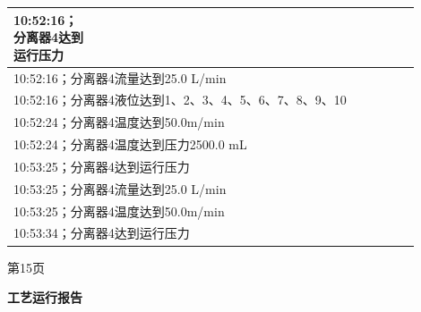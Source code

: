 \documentclass[UTF8,10pt,a4paper,fontset=fandol]{ctexart}
\newcommand{\fieldvalue}[1]{#1}
\begin{document}
\begin{center}
\begin{minipage}[t]{0.47\linewidth}
\begin{tabular}{|p{0.18\linewidth}|p{0.72\linewidth}|}
{\fieldvalue{10:52:16；分离器4达到运行压力}} \\ \hline
\multicolumn{2}{|l|}{
\fieldvalue{10:52:16；分离器4流量达到25.0 L/min}} \\ \hline
\multicolumn{2}{|l|}{
\fieldvalue{10:52:16；分离器4液位达到1、2、3、4、5、6、7、8、9、10}} \\ \hline
\multicolumn{2}{|l|}{
\fieldvalue{10:52:24；分离器4温度达到50.0m/min}} \\ \hline
\multicolumn{2}{|l|}{
\fieldvalue{10:52:24；分离器4温度达到压力2500.0 mL}} \\ \hline
\multicolumn{2}{|l|}{
\fieldvalue{10:53:25；分离器4达到运行压力}} \\ \hline
\multicolumn{2}{|l|}{
\fieldvalue{10:53:25；分离器4流量达到25.0 L/min}} \\ \hline
\multicolumn{2}{|l|}{
\fieldvalue{10:53:25；分离器4温度达到50.0m/min}} \\ \hline
\multicolumn{2}{|l|}{
\fieldvalue{10:53:34；分离器4达到运行压力}} \\ \hline
\end{tabular}

\vspace{1mm}
第15页
\end{minipage}
\hfill
\begin{minipage}[t]{0.47\linewidth}
\centering
\textbf{工艺运行报告}


\end{minipage}
\end{center}
\end{document}
